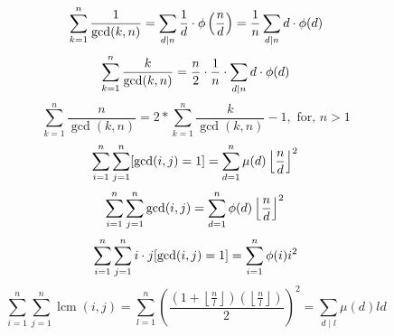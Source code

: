 \begin{equation}
\sum_{k=1}^n \frac{1}{\operatorname{gcd}(k, n)}=\sum_{d \mid n} \frac{1}{d} \cdot \phi\left(\frac{n}{d}\right)=\frac{1}{n} \sum_{d \mid n} d \cdot \phi(d) \\
\end{equation}
\begin{equation}
\sum_{k=1}^n \frac{k}{\operatorname{gcd}(k, n)}=\frac{n}{2} \cdot \frac{1}{n} \cdot \sum_{d \mid n} d \cdot \phi(d) \\
\end{equation}
\begin{equation}
\sum_{k=1}^n \frac{n}{\operatorname{gcd}(k, n)}=2 * \sum_{k=1}^n \frac{k}{\operatorname{gcd}(k, n)}-1, \text { for, } n>1
\end{equation}
\begin{equation}
\sum_{i=1}^n \sum_{j=1}^n[\operatorname{gcd}(i, j)=1]=\sum_{d=1}^n \mu(d)\left\lfloor\frac{n}{d}\right\rfloor^2 \\
\end{equation}
\begin{equation}
\sum_{i=1}^n \sum_{j=1}^n \operatorname{gcd}(i, j)=\sum_{d=1}^n \phi(d)\left\lfloor\frac{n}{d}\right\rfloor^2 \\
\end{equation}
\begin{equation}
\sum_{i=1}^n \sum_{j=1}^n i \cdot j[\operatorname{gcd}(i, j)=1]=\sum_{i=1}^n \phi(i) i^2 \\
\end{equation}
\begin{equation}
\sum_{i=1}^n \sum_{j=1}^n \operatorname{lcm}(i, j)=\sum_{l=1}^n\left(\frac{\left(1+\left\lfloor\frac{n}{l}\right\rfloor\right)\left(\left\lfloor\frac{n}{l}\right\rfloor\right)}{2}\right)^2=\sum_{d \mid l} \mu(d) l d
\end{equation}